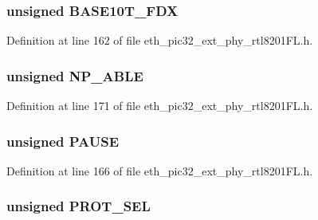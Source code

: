 \subsubsection[{B\+A\+S\+E10\+T\+\_\+\+F\+D\+X}]{\setlength{\rightskip}{0pt plus 5cm}unsigned B\+A\+S\+E10\+T\+\_\+\+F\+D\+X}\label{union_____a_n_a_dbits__t_a60f1f5eeed205a15bb647dffff3a2ee3}


Definition at line 162 of file eth\+\_\+pic32\+\_\+ext\+\_\+phy\+\_\+rtl8201\+F\+L.\+h.

\hypertarget{union_____a_n_a_dbits__t_a4502f03b3664f0c1b02bfbfdae50f349}{}
\subsubsection[{N\+P\+\_\+\+A\+B\+L\+E}]{\setlength{\rightskip}{0pt plus 5cm}unsigned N\+P\+\_\+\+A\+B\+L\+E}\label{union_____a_n_a_dbits__t_a4502f03b3664f0c1b02bfbfdae50f349}


Definition at line 171 of file eth\+\_\+pic32\+\_\+ext\+\_\+phy\+\_\+rtl8201\+F\+L.\+h.

\hypertarget{union_____a_n_a_dbits__t_ad4492e8a008bd744e8ee4a73bc202e78}{}
\subsubsection[{P\+A\+U\+S\+E}]{\setlength{\rightskip}{0pt plus 5cm}unsigned P\+A\+U\+S\+E}\label{union_____a_n_a_dbits__t_ad4492e8a008bd744e8ee4a73bc202e78}


Definition at line 166 of file eth\+\_\+pic32\+\_\+ext\+\_\+phy\+\_\+rtl8201\+F\+L.\+h.

\hypertarget{union_____a_n_a_dbits__t_a05f4c23498c1cea5cfbfbbbc964f044b}{}
\subsubsection[{P\+R\+O\+T\+\_\+\+S\+E\+L}]{\setlength{\rightskip}{0pt plus 5cm}unsigned P\+R\+O\+T\+\_\+\+S\+E\+L}\label{union_____a_n_a_dbits__t_a05f4c23498c1cea5cfbfbbbc964f044b}


